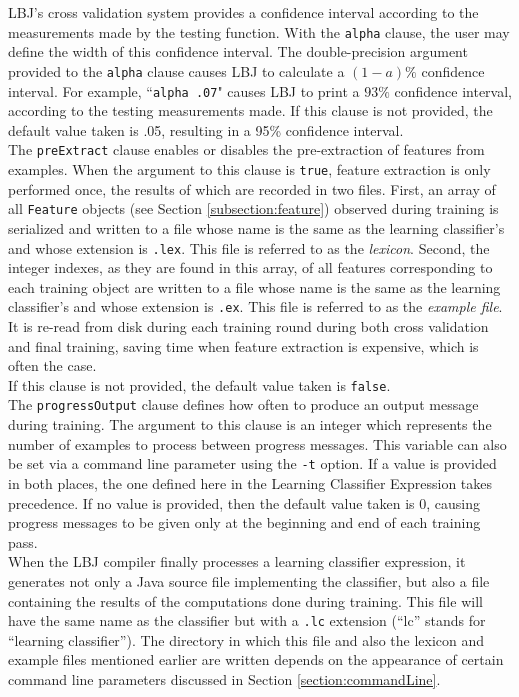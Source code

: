 LBJ's cross validation system provides a confidence interval according to the
measurements made by the testing function. With the {\tt alpha} clause, the
user may define the width of this confidence interval. The double-precision
argument provided to the {\tt alpha} clause causes LBJ to calculate a
$(1-a)\%$ confidence interval. For example, ``{\tt alpha .07}" causes LBJ to
print a $93\%$ confidence interval, according to the testing measurements
made. If this clause is not provided, the default value taken is .05, resulting 
in a 95\% confidence interval.\\

The {\tt preExtract} clause enables or disables the pre-extraction of features
from examples. When the argument to this clause is  {\tt true}, feature
extraction is only performed once, the results of which are recorded in two
files.  First, an array of all {\tt Feature} objects (see Section
\ref{subsection:feature}) observed during training is serialized and written
to a file whose name is the same as the learning classifier's and whose
extension is {\tt .lex}.  This file is referred to as the \emph{lexicon}.
Second, the integer indexes, as they are found in this array, of all features
corresponding to each training object are written to a file whose name is the
same as the learning classifier's and whose extension is {\tt .ex}.  This file
is referred to as the \emph{example file}.  It is re-read from disk during
each training round during both cross validation and final training, saving
time when feature extraction is expensive, which is often the case. \\
If this clause is not provided, the default value taken is {\tt false}.\\

The {\tt progressOutput} clause defines how often to produce an output message
during training. The argument to this clause is an integer which represents
the number of examples to process between progress messages. This variable 
can also be set via a command line parameter using the {\tt -t} option. If a value 
is provided in both places, the one defined here in the Learning Classifier Expression 
takes precedence. If no value is provided, then the default value taken is 0, 
causing progress messages to be given only at the beginning and end of each 
training pass.  \\

When the LBJ compiler finally processes a learning classifier expression, it
generates not only a Java source file implementing the classifier, but also a
file containing the results of the computations done during training.  This
file will have the same name as the classifier but with a {\tt .lc} extension
(``lc'' stands for ``learning classifier'').  The directory in which this file
and also the lexicon and example files mentioned earlier are written depends
on the appearance of certain command line parameters discussed in Section
\ref{section:commandLine}.

